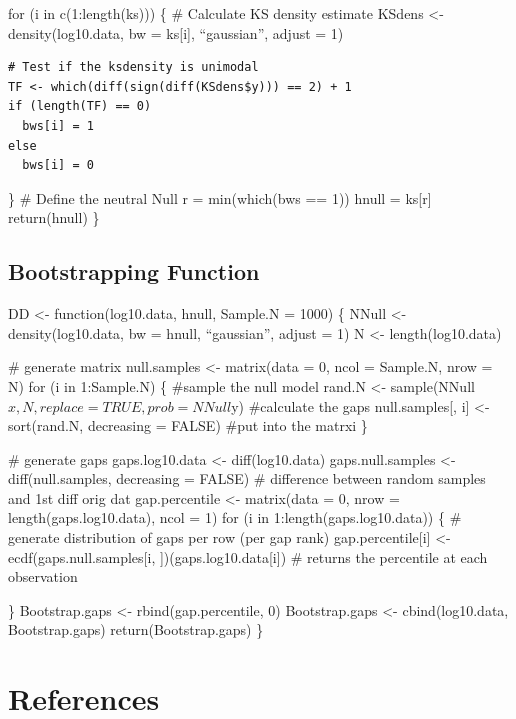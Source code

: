 \documentclass[print]{nuthesis}
\begin{document}
for (i in c(1:length(ks))) \{
\# Calculate KS density estimate
KSdens \textless- density(log10.data, bw = ks{[}i{]}, ``gaussian'', adjust = 1)
\begin{verbatim}
# Test if the ksdensity is unimodal
TF <- which(diff(sign(diff(KSdens$y))) == 2) + 1
if (length(TF) == 0)
  bws[i] = 1
else
  bws[i] = 0
\end{verbatim}
\}
\# Define the neutral Null
r = min(which(bws == 1))
hnull = ks{[}r{]}
return(hnull)
\}

\hypertarget{bootstrapping-function}{%
\section{Bootstrapping Function}\label{bootstrapping-function}}

DD \textless- function(log10.data, hnull, Sample.N = 1000) \{
NNull \textless- density(log10.data, bw = hnull, ``gaussian'', adjust = 1)
N \textless- length(log10.data)

\# generate matrix
null.samples \textless- matrix(data = 0,
ncol = Sample.N,
nrow = N)
for (i in 1:Sample.N) \{
\#sample the null model
rand.N \textless- sample(NNull\(x, N, replace = TRUE, prob = NNull\)y)
\#calculate the gaps
null.samples{[}, i{]} \textless- sort(rand.N, decreasing = FALSE)
\#put into the matrxi
\}

\# generate gaps
gaps.log10.data \textless- diff(log10.data)
gaps.null.samples \textless- diff(null.samples, decreasing = FALSE) \# difference between random samples and 1st diff orig dat
gap.percentile \textless- matrix(data = 0,
nrow = length(gaps.log10.data),
ncol = 1)
for (i in 1:length(gaps.log10.data)) \{
\# generate distribution of gaps per row (per gap rank)
gap.percentile{[}i{]} \textless-
ecdf(gaps.null.samples{[}i, {]})(gaps.log10.data{[}i{]}) \# returns the percentile at each observation

\}
Bootstrap.gaps \textless- rbind(gap.percentile, 0)
Bootstrap.gaps \textless- cbind(log10.data, Bootstrap.gaps)
return(Bootstrap.gaps)
\}

\backmatter

\hypertarget{references}{%
\chapter*{References}\label{references}}


\noindent
\end{document}
